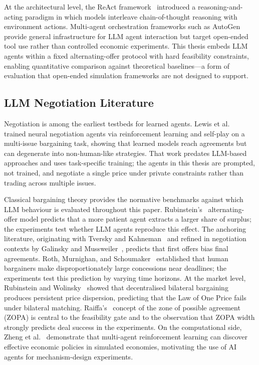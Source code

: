 At the architectural level, the ReAct framework~\cite{yao2023react} introduced a reasoning-and-acting paradigm in which models interleave chain-of-thought reasoning with environment actions.  Multi-agent orchestration frameworks such as AutoGen~\cite{wu2023autogen} provide general infrastructure for LLM agent interaction but target open-ended tool use rather than controlled economic experiments.  This thesis embeds LLM agents within a fixed alternating-offer protocol with hard feasibility constraints, enabling quantitative comparison against theoretical baselines---a form of evaluation that open-ended simulation frameworks are not designed to support.

\subsection{LLM Negotiation Literature}
\label{sec:rw_negotiation}

Negotiation is among the earliest testbeds for learned agents.  Lewis et al.~\cite{lewis2017dealornodeal} trained neural negotiation agents via reinforcement learning and self-play on a multi-issue bargaining task, showing that learned models reach agreements but can degenerate into non-human-like strategies.  That work predates LLM-based approaches and uses task-specific training; the agents in this thesis are prompted, not trained, and negotiate a single price under private constraints rather than trading across multiple issues.

Classical bargaining theory provides the normative benchmarks against which LLM behaviour is evaluated throughout this paper.  Rubinstein's~\cite{rubinstein1982} alternating-offer model predicts that a more patient agent extracts a larger share of surplus; the experiments test whether LLM agents reproduce this effect.  The anchoring literature, originating with Tversky and Kahneman~\cite{tversky1974} and refined in negotiation contexts by Galinsky and Mussweiler~\cite{galinsky2001}, predicts that first offers bias final agreements.  Roth, Murnighan, and Schoumaker~\cite{roth1988deadline} established that human bargainers make disproportionately large concessions near deadlines; the experiments test this prediction by varying time horizons.  At the market level, Rubinstein and Wolinsky~\cite{rubinstein1985} showed that decentralised bilateral bargaining produces persistent price dispersion, predicting that the Law of One Price fails under bilateral matching.  Raiffa's~\cite{raiffa1982} concept of the zone of possible agreement (ZOPA) is central to the feasibility gate and to the observation that ZOPA width strongly predicts deal success in the experiments.  On the computational side, Zheng et al.~\cite{zheng2020aieconomist} demonstrate that multi-agent reinforcement learning can discover effective economic policies in simulated economies, motivating the use of AI agents for mechanism-design experiments.

